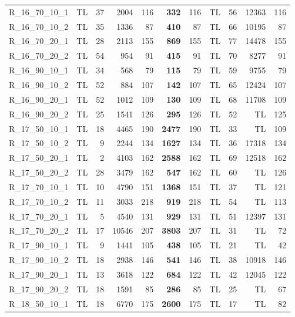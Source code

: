 \documentclass{article}
\begin{document}
\begin{longtable}{lrrrrrrrrrr}
R\_16\_70\_10\_1 & TL & 37 & 2004 & 116 & \textbf{332} & 116 & TL & 56 & 12363 & 116 \\
R\_16\_70\_10\_2 & TL & 35 & 1336 & 87 & \textbf{410} & 87 & TL & 66 & 10195 & 87 \\
R\_16\_70\_20\_1 & TL & 28 & 2113 & 155 & \textbf{869} & 155 & TL & 77 & 14478 & 155 \\
R\_16\_70\_20\_2 & TL & 54 & 954 & 91 & \textbf{415} & 91 & TL & 70 & 8277 & 91 \\
R\_16\_90\_10\_1 & TL & 34 & 568 & 79 & \textbf{115} & 79 & TL & 59 & 9755 & 79 \\
R\_16\_90\_10\_2 & TL & 52 & 884 & 107 & \textbf{142} & 107 & TL & 65 & 12424 & 107 \\
R\_16\_90\_20\_1 & TL & 52 & 1012 & 109 & \textbf{130} & 109 & TL & 68 & 11708 & 109 \\
R\_16\_90\_20\_2 & TL & 25 & 1541 & 126 & \textbf{295} & 126 & TL & 52 & TL & 125 \\
R\_17\_50\_10\_1 & TL & 18 & 4465 & 190 & \textbf{2477} & 190 & TL & 33 & TL & 109 \\
R\_17\_50\_10\_2 & TL & 9 & 2244 & 134 & \textbf{1627} & 134 & TL & 36 & 17318 & 134 \\
R\_17\_50\_20\_1 & TL & 2 & 4103 & 162 & \textbf{2588} & 162 & TL & 69 & 12518 & 162 \\
R\_17\_50\_20\_2 & TL & 28 & 3479 & 162 & \textbf{547} & 162 & TL & 60 & TL & 126 \\
R\_17\_70\_10\_1 & TL & 10 & 4790 & 151 & \textbf{1368} & 151 & TL & 37 & TL & 121 \\
R\_17\_70\_10\_2 & TL & 11 & 3033 & 218 & \textbf{919} & 218 & TL & 54 & TL & 113 \\
R\_17\_70\_20\_1 & TL & 5 & 4540 & 131 & \textbf{929} & 131 & TL & 51 & 12397 & 131 \\
R\_17\_70\_20\_2 & TL & 17 & 10546 & 207 & \textbf{3803} & 207 & TL & 31 & TL & 72 \\
R\_17\_90\_10\_1 & TL & 9 & 1441 & 105 & \textbf{438} & 105 & TL & 21 & TL & 42 \\
R\_17\_90\_10\_2 & TL & 18 & 2938 & 146 & \textbf{541} & 146 & TL & 38 & 10918 & 146 \\
R\_17\_90\_20\_1 & TL & 13 & 3618 & 122 & \textbf{684} & 122 & TL & 42 & 12045 & 122 \\
R\_17\_90\_20\_2 & TL & 18 & 1591 & 85 & \textbf{286} & 85 & TL & 25 & TL & 67 \\
R\_18\_50\_10\_1 & TL & 18 & 6770 & 175 & \textbf{2600} & 175 & TL & 17 & TL & 82 \\

\end{longtable}
\end{document}
